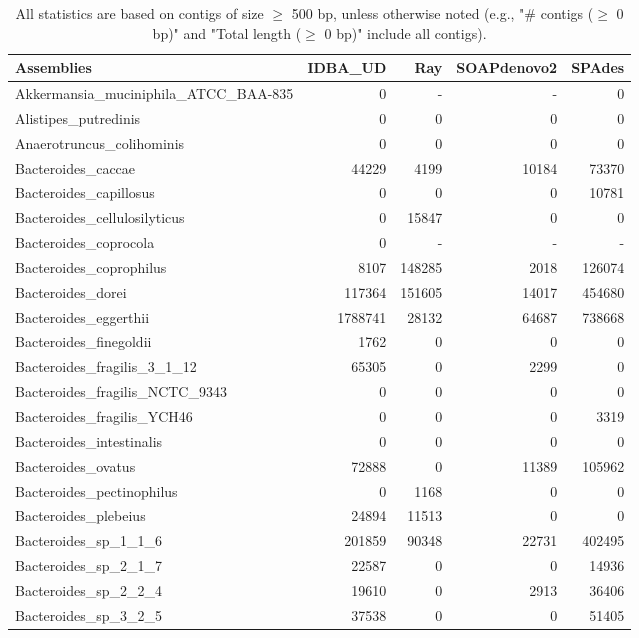 \documentclass[12pt,a4paper]{article}
\begin{document}
\begin{table}[ht]
\begin{center}
\caption{All statistics are based on contigs of size $\geq$ 500 bp, unless otherwise noted (e.g., "\# contigs ($\geq$ 0 bp)" and "Total length ($\geq$ 0 bp)" include all contigs).}
\begin{tabular}{|l*{4}{|r}|}
\hline
Assemblies & IDBA\_UD & Ray & SOAPdenovo2 & SPAdes \\ \hline
Akkermansia\_muciniphila\_ATCC\_BAA-835 & 0 & - & - & 0 \\ \hline
Alistipes\_putredinis & 0 & 0 & 0 & 0 \\ \hline
Anaerotruncus\_colihominis & 0 & 0 & 0 & 0 \\ \hline
Bacteroides\_caccae & 44229 & 4199 & 10184 & 73370 \\ \hline
Bacteroides\_capillosus & 0 & 0 & 0 & 10781 \\ \hline
Bacteroides\_cellulosilyticus & 0 & 15847 & 0 & 0 \\ \hline
Bacteroides\_coprocola & 0 & - & - & - \\ \hline
Bacteroides\_coprophilus & 8107 & 148285 & 2018 & 126074 \\ \hline
Bacteroides\_dorei & 117364 & 151605 & 14017 & 454680 \\ \hline
Bacteroides\_eggerthii & 1788741 & 28132 & 64687 & 738668 \\ \hline
Bacteroides\_finegoldii & 1762 & 0 & 0 & 0 \\ \hline
Bacteroides\_fragilis\_3\_1\_12 & 65305 & 0 & 2299 & 0 \\ \hline
Bacteroides\_fragilis\_NCTC\_9343 & 0 & 0 & 0 & 0 \\ \hline
Bacteroides\_fragilis\_YCH46 & 0 & 0 & 0 & 3319 \\ \hline
Bacteroides\_intestinalis & 0 & 0 & 0 & 0 \\ \hline
Bacteroides\_ovatus & 72888 & 0 & 11389 & 105962 \\ \hline
Bacteroides\_pectinophilus & 0 & 1168 & 0 & 0 \\ \hline
Bacteroides\_plebeius & 24894 & 11513 & 0 & 0 \\ \hline
Bacteroides\_sp\_1\_1\_6 & 201859 & 90348 & 22731 & 402495 \\ \hline
Bacteroides\_sp\_2\_1\_7 & 22587 & 0 & 0 & 14936 \\ \hline
Bacteroides\_sp\_2\_2\_4 & 19610 & 0 & 2913 & 36406 \\ \hline
Bacteroides\_sp\_3\_2\_5 & 37538 & 0 & 0 & 51405 \\ \hline

\end{tabular}
\end{center}
\end{table}
\end{document}
